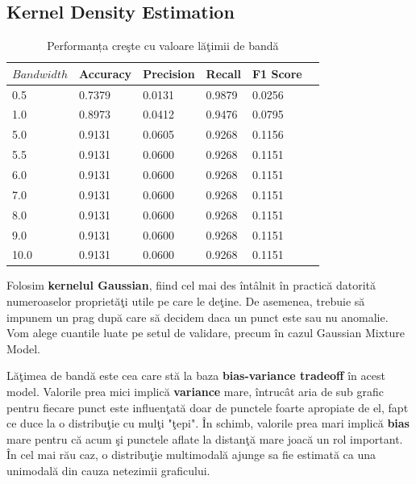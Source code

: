 \subsection{Kernel Density Estimation}

\begin{table}[H]
  \centering
  \begin{tabularx}{\textwidth}{
      |X
      |X
      |X
      |X
      |X
      |X|
  }
  \hline
  $Bandwidth$ & {Accuracy} & {Precision} & {Recall} & {F1 Score} \\
  \hline
  \rowcolor{gray!20} 0.5 & 0.7379 & 0.0131 & 0.9879 & 0.0256 \\
  1.0 & 0.8973 & 0.0412 & 0.9476 & 0.0795 \\
  \rowcolor{gray!20} 5.0 & 0.9131 & 0.0605 & 0.9268 & 0.1156 \\
  5.5 & 0.9131 & 0.0600 & 0.9268 & 0.1151 \\
  \rowcolor{gray!20} 6.0 & 0.9131 & 0.0600 & 0.9268 & 0.1151 \\
  7.0 & 0.9131 & 0.0600 & 0.9268 & 0.1151 \\
  \rowcolor{gray!20} 8.0 & 0.9131 & 0.0600 & 0.9268 & 0.1151 \\
  9.0 & 0.9131 & 0.0600 & 0.9268 & 0.1151 \\
  \rowcolor{gray!20} 10.0 & 0.9131 & 0.0600 & 0.9268 & 0.1151 \\
  \hline
  \end{tabularx}
  \caption{Performanța creşte cu valoare lăţimii de bandă}
\end{table}

Folosim \textbf{kernelul Gaussian}, fiind cel mai des întâlnit în practică
datorită numeroaselor proprietăţi utile pe care le deţine. De asemenea, trebuie 
să impunem un prag după care să decidem daca un punct este sau nu anomalie. 
Vom alege cuantile luate pe setul de validare, precum în cazul 
Gaussian Mixture Model.

Lăţimea de bandă este cea care stă la baza \textbf{bias-variance tradeoff} 
în acest model.
Valorile prea mici implică \textbf{variance} mare, întrucât aria de sub grafic 
pentru fiecare punct este influenţată doar de punctele foarte apropiate de el, 
fapt ce duce la o distribuţie cu mulţi "ţepi". 
În schimb, valorile prea mari implică \textbf{bias} mare pentru că acum şi punctele 
aflate la distanţă mare joacă un rol important. În cel mai rău caz, o distribuţie 
multimodală ajunge sa fie estimată ca una unimodală din cauza netezimii graficului.

